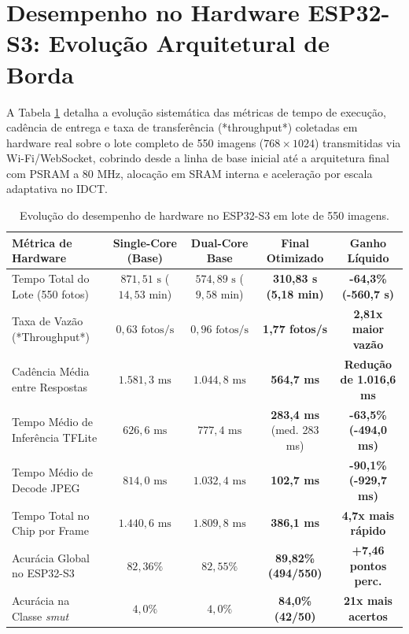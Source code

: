 \section{Desempenho no Hardware ESP32-S3: Evolução Arquitetural de Borda}

A Tabela \ref{tab:benchmark_hardware} detalha a evolução sistemática das métricas de tempo de execução, cadência de entrega e taxa de transferência (*throughput*) coletadas em hardware real sobre o lote completo de 550 imagens ($768 \times 1024$) transmitidas via Wi-Fi/WebSocket, cobrindo desde a linha de base inicial até a arquitetura final com PSRAM a 80 MHz, alocação em SRAM interna e aceleração por escala adaptativa no IDCT.

\begin{table}[H]
\centering
\small
\caption{Evolução do desempenho de hardware no ESP32-S3 em lote de 550 imagens.}
\label{tab:benchmark_hardware}
\begin{tabular}{lcccc}
\toprule
\textbf{Métrica de Hardware} & \textbf{Single-Core (Base)} & \textbf{Dual-Core Base} & \textbf{Final Otimizado} & \textbf{Ganho Líquido} \\
\midrule
Tempo Total do Lote (550 fotos) & $871,51\text{ s}$ ($14,53\text{ min}$) & $574,89\text{ s}$ ($9,58\text{ min}$) & \textbf{310,83 s (5,18 min)} & \textbf{-64,3\% (-560,7 s)} \\
Taxa de Vazão (*Throughput*)    & $0,63\text{ fotos/s}$                  & $0,96\text{ fotos/s}$                 & \textbf{1,77 fotos/s}        & \textbf{2,81x maior vazão} \\
Cadência Média entre Respostas  & $1.581,3\text{ ms}$                    & $1.044,8\text{ ms}$                   & \textbf{564,7 ms}            & \textbf{Redução de 1.016,6 ms} \\
Tempo Médio de Inferência TFLite & $626,6\text{ ms}$                     & $777,4\text{ ms}$                     & \textbf{283,4 ms} (med. 283 ms) & \textbf{-63,5\% (-494,0 ms)} \\
Tempo Médio de Decode JPEG       & $814,0\text{ ms}$                     & $1.032,4\text{ ms}$                   & \textbf{102,7 ms}            & \textbf{-90,1\% (-929,7 ms)} \\
Tempo Total no Chip por Frame    & $1.440,6\text{ ms}$                   & $1.809,8\text{ ms}$                   & \textbf{386,1 ms}            & \textbf{4,7x mais rápido} \\
Acurácia Global no ESP32-S3     & $82,36\%$                              & $82,55\%$                             & \textbf{89,82\% (494/550)}   & \textbf{+7,46 pontos perc.} \\
Acurácia na Classe \textit{smut} & $4,0\%$                               & $4,0\%$                               & \textbf{84,0\% (42/50)}      & \textbf{21x mais acertos} \\
\bottomrule
\end{tabular}
\end{table}

